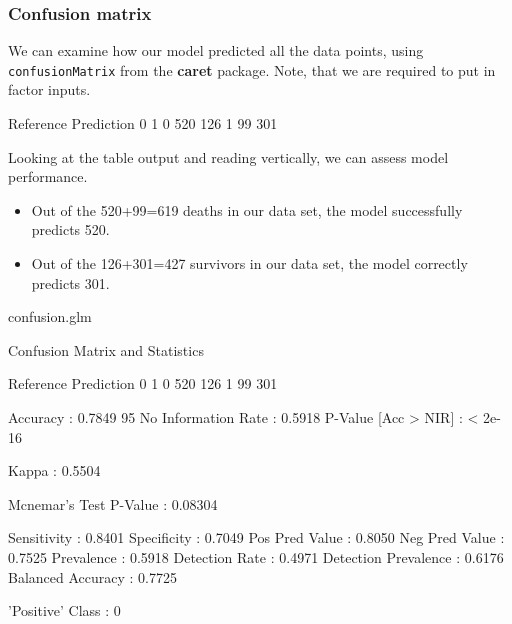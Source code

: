 \documentclass[a4paper]{article}
\begin{document}
\subsubsection{Confusion matrix}
We can examine how our model predicted all the data points, using \lstinline|confusionMatrix| from the \textbf{caret} package. Note, that we are required to put in factor inputs.
\begin{Schunk}
\begin{Soutput}
          Reference
Prediction   0   1
         0 520 126
         1  99 301
\end{Soutput}
\end{Schunk}
Looking at the table output and reading vertically, we can assess model performance.
\begin{itemize}
	\item Out of the 520+99=619 deaths in our data set, the model successfully predicts 520.
	\item Out of the 126+301=427 survivors in our data set, the model correctly predicts 301.
\end{itemize}
\begin{Schunk}
\begin{Sinput}
confusion.glm
\end{Sinput}
\begin{Soutput}
Confusion Matrix and Statistics

          Reference
Prediction   0   1
         0 520 126
         1  99 301
                                          
               Accuracy : 0.7849          
                 95%
    No Information Rate : 0.5918          
    P-Value [Acc > NIR] : < 2e-16         
                                          
                  Kappa : 0.5504          
                                          
 Mcnemar's Test P-Value : 0.08304         
                                          
            Sensitivity : 0.8401          
            Specificity : 0.7049          
         Pos Pred Value : 0.8050          
         Neg Pred Value : 0.7525          
             Prevalence : 0.5918          
         Detection Rate : 0.4971          
   Detection Prevalence : 0.6176          
      Balanced Accuracy : 0.7725          
                                          
       'Positive' Class : 0               
                                          
\end{Soutput}
\end{Schunk}
\end{document}
